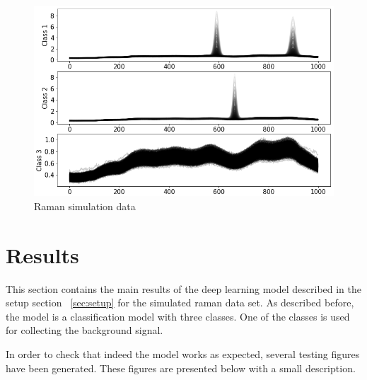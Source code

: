 \documentclass{article}
\begin{document}
\begin{figure}[!h]
	\centering
	\includegraphics[width=1\linewidth]{figures_3/raman_sim_training_data_2.png}  
	\caption{Raman simulation data}
	\label{fig:raman}
\end{figure}



\section{Results}
\label{sec:results}
This section contains the main results of the deep learning model described in the setup section ~\ref{sec:setup} for the simulated raman data set.
As described before, the model is a classification model with three classes. One of the classes is used for collecting the background signal.

In order to check that indeed the model works as expected, several testing figures have been generated. These figures are presented below with a small description.
\end{document}

